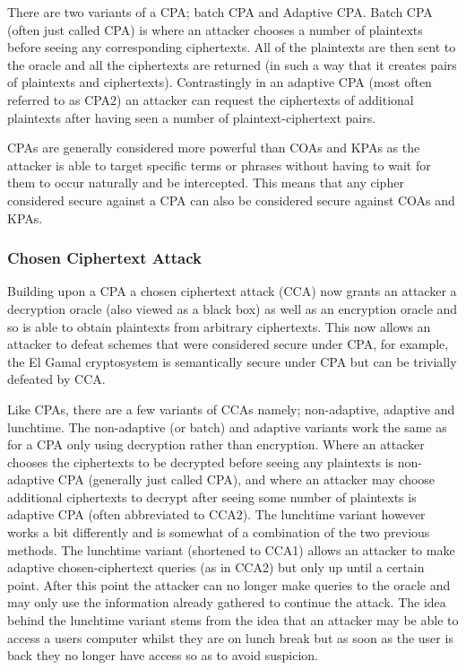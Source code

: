 \documentclass[10pt,journal,compsoc]{IEEEtran}
\begin{document}
There are two variants of a CPA; batch CPA and Adaptive CPA. Batch CPA (often just called CPA) is where an attacker chooses a number of plaintexts before seeing any corresponding ciphertexts. All of the plaintexts are then sent to the oracle and all the ciphertexts are returned (in such a way that it creates pairs of plaintexts and ciphertexts). Contrastingly in an adaptive CPA (most often referred to as CPA2) an attacker can request the ciphertexts of additional plaintexts after having seen a number of plaintext-ciphertext pairs.

CPAs are generally considered more powerful than COAs and KPAs as the attacker is able to target specific terms or phrases without having to wait for them to occur naturally and be intercepted. This means that any cipher considered secure against a CPA can also be considered secure against COAs and KPAs.

\subsubsection{Chosen Ciphertext Attack}
Building upon a CPA a chosen ciphertext attack (CCA) now grants an attacker a decryption oracle (also viewed as a black box) as well as an encryption oracle and so is able to obtain plaintexts from arbitrary ciphertexts. This now allows an attacker to defeat schemes that were considered secure under CPA, for example, the El Gamal cryptosystem is semantically secure under CPA but can be trivially defeated by CCA.

Like CPAs, there are a few variants of CCAs namely; non-adaptive, adaptive and lunchtime. The non-adaptive (or batch) and adaptive variants work the same as for a CPA only using decryption rather than encryption. Where an attacker chooses the ciphertexts to be decrypted before seeing any plaintexts is non-adaptive CPA (generally just called CPA), and where an attacker may choose additional ciphertexts to decrypt after seeing some number of plaintexts is adaptive CPA (often abbreviated to CCA2). The lunchtime variant however works a bit differently and is somewhat of a combination of the two previous methods. The lunchtime variant (shortened to CCA1) allows an attacker to make adaptive chosen-ciphertext queries (as in CCA2) but only up until a certain point. After this point the attacker can no longer make queries to the oracle and may only use the information already gathered to continue the attack. The idea behind the lunchtime variant stems from the idea that an attacker may be able to access a users computer whilst they are on lunch break but as soon as the user is back they no longer have access so as to avoid suspicion.
\end{document}

